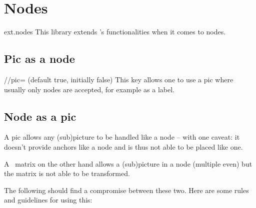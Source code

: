 %
%
%

\section{Nodes}
\begin{tikzlibrary}{ext.nodes}
This library extends \tikzname's functionalities when it comes to nodes.
\end{tikzlibrary}

\begin{multicols}{2}
\subsection{Pic as a node}
\begin{key}{/\tikzext/pic= (default true, initially false)}
This key allows one to use a pic where usually only nodes are accepted,
for example as a label.
\begin{codeexample}[preamble=\usetikzlibrary{ext.nodes, ext.misc}]
\begin{tikzpicture}[
  slsl/.pic={\draw(-2pt, 1.5pt)--( 2pt, .5pt)
                  ( 2pt,-1.5pt)--(-2pt,-.5pt);}]
\node[
  draw, minimum width=3cm, minimum height=1cm,
  label={[ext/pic            ] east:slsl},
  label={[ext/pic, rotate= 90]north:slsl},
  label={[ext/pic            ] west:slsl},
  label={[ext/pic, rotate=-90]south:slsl}]{};
\end{tikzpicture}
\end{codeexample}
\end{key}
\newcolumn

\subsection{Node as a pic}
A pic allows any (sub)picture to be handled like a node --
with one caveat: it doesn't provide anchors like a node and
is thus not able to be placed like one.

A \pgfname\ matrix on the other hand allows a (sub)picture in a node (multiple even)
but the matrix is not able to be transformed.

The following should find a compromise between these two.
Here are some rules and guidelines for using this:


\end{multicols}
